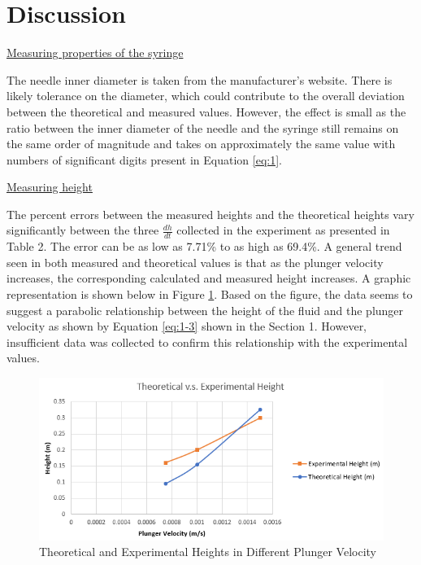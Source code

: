 \documentclass{article}
\begin{document}
\section{Discussion}
\underline{Measuring properties of the syringe}

The needle inner diameter is taken from the manufacturer's website. There is likely tolerance on the diameter, which could contribute to the overall deviation between the theoretical and measured values. However, the effect is small as the ratio between the inner diameter of the needle and the syringe still remains on the same order of magnitude and takes on approximately the same value with numbers of significant digits present in Equation \ref{eq:1}.

\noindent\underline{Measuring height}

The percent errors between the measured heights and the theoretical heights vary significantly between the three $\frac{dh}{dt}$ collected in the experiment as presented in Table 2. The error can be as low as 7.71\% to as high as 69.4\%. A general trend seen in both measured and theoretical values is that as the plunger velocity increases, the corresponding calculated and measured height  increases. A graphic representation is shown below in Figure \ref{fig:3}. Based on the figure, the data seems to suggest a parabolic relationship between the height of the fluid and the plunger velocity as shown by Equation \ref{eq:1-3} shown in the Section 1. However, insufficient data was collected to confirm this relationship with the experimental values.

\begin{figure}[h!]
\centering
  \includegraphics[width=150mm]{graph.png}
  \captionsetup{justification=centering}
  \caption{Theoretical and Experimental Heights in Different Plunger Velocity}
  \label{fig:3}
\end{figure}
\end{document}
